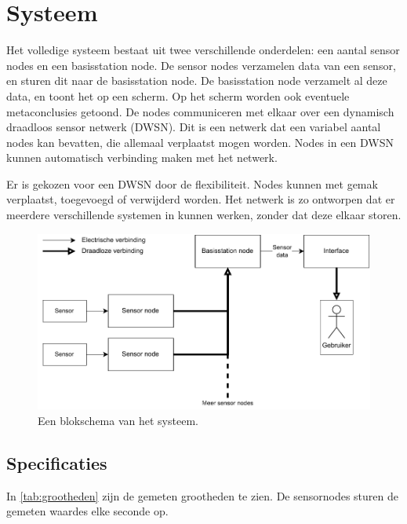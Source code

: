 \section{Systeem}
Het volledige systeem bestaat uit twee verschillende onderdelen: een aantal sensor nodes en een basisstation node.
De sensor nodes verzamelen data van een sensor, en sturen dit naar de basisstation node. De basisstation node verzamelt al deze data, en toont het op een scherm. Op het scherm worden ook eventuele metaconclusies getoond.
De nodes communiceren met elkaar over een dynamisch draadloos sensor netwerk (DWSN).
Dit is een netwerk dat een variabel aantal nodes kan bevatten, die allemaal verplaatst mogen worden. Nodes in een DWSN kunnen automatisch verbinding maken met het netwerk.

Er is gekozen voor een DWSN door de flexibiliteit. Nodes kunnen met gemak verplaatst, toegevoegd of verwijderd worden. Het netwerk is zo ontworpen dat er meerdere verschillende systemen in kunnen werken, zonder dat deze  elkaar storen.

\begin{figure}[ht]
    \centering
    \includegraphics{img/fullsystem.pdf}
    \caption{Een blokschema van het systeem.}
    \label{fig:fullsystem}
\end{figure}

\subsection{Specificaties}

In \autoref{tab:grootheden} zijn de gemeten grootheden te zien.
De sensornodes sturen de gemeten waardes elke seconde op. 

